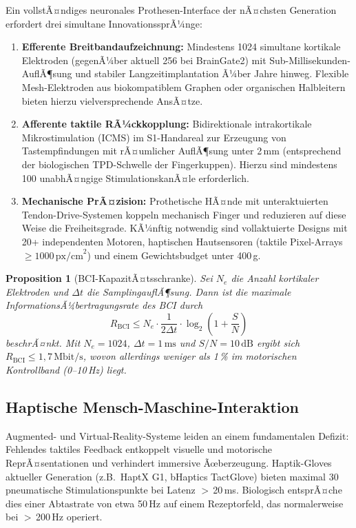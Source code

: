 ﻿\documentclass[12pt,a4paper]{report}
\theoremstyle{plain}
\newtheorem{proposition}[theorem]{Proposition}
\theoremstyle{definition}
\theoremstyle{remark}
\begin{document}
Ein vollstÃ¤ndiges neuronales Prothesen-Interface der nÃ¤chsten Generation
erfordert drei simultane InnovationssprÃ¼nge:

\begin{enumerate}
\item \textbf{Efferente Breitbandaufzeichnung:} Mindestens 1024 simultane
  kortikale Elektroden (gegenÃ¼ber aktuell 256 bei BrainGate2) mit
  Sub-Millisekunden-AuflÃ¶sung und stabiler Langzeitimplantation Ã¼ber
  Jahre hinweg. Flexible Mesh-Elektroden aus biokompatiblem Graphen
  oder organischen Halbleitern bieten hierzu vielversprechende AnsÃ¤tze.
\item \textbf{Afferente taktile RÃ¼ckkopplung:} Bidirektionale
  intrakortikale Mikrostimulation (ICMS) im S1-Handareal zur Erzeugung
  von Tastempfindungen mit rÃ¤umlicher AuflÃ¶sung unter 2\,mm
  (entsprechend der biologischen TPD-Schwelle der Fingerkuppen).
  Hierzu sind mindestens 100 unabhÃ¤ngige StimulationskanÃ¤le erforderlich.
\item \textbf{Mechanische PrÃ¤zision:} Prothetische HÃ¤nde mit
  unteraktuierten Tendon-Drive-Systemen koppeln mechanisch Finger
  und reduzieren auf diese Weise die Freiheitsgrade. KÃ¼nftig notwendig
  sind vollaktuierte Designs mit 20+ independenten Motoren,
  haptischen Hautsensoren (taktile Pixel-Arrays $\geq 1000\,\text{px/cm}^2$)
  und einem Gewichtsbudget unter 400\,g.
\end{enumerate}

\begin{proposition}[BCI-KapazitÃ¤tsschranke]
Sei $N_e$ die Anzahl kortikaler Elektroden und $\Delta t$ die
SamplingauflÃ¶sung. Dann ist die maximale InformationsÃ¼bertragungsrate
des BCI durch
\begin{equation}
  R_{\mathrm{BCI}} \leq N_e \cdot \frac{1}{2\Delta t}
  \cdot \log_2\!\left(1 + \frac{S}{N}\right)
\end{equation}
beschrÃ¤nkt. Mit $N_e = 1024$, $\Delta t = 1\,\mathrm{ms}$ und
$S/N = 10\,\mathrm{dB}$ ergibt sich $R_{\mathrm{BCI}} \leq 1{,}7\,\mathrm{Mbit/s}$,
wovon allerdings weniger als 1\,\% im motorischen Kontrollband
(0--10\,Hz) liegt.
\end{proposition}

\subsection{Haptische Mensch-Maschine-Interaktion}

Augmented- und Virtual-Reality-Systeme leiden an einem fundamentalen
Defizit: Fehlendes taktiles Feedback entkoppelt visuelle und motorische
ReprÃ¤sentationen und verhindert immersive Ãœberzeugung. Haptik-Gloves
aktueller Generation (z.B.\ HaptX G1, bHaptics TactGlove) bieten
maximal 30 pneumatische Stimulationspunkte bei Latenz $>$\,20\,ms.
Biologisch entsprÃ¤che dies einer Abtastrate von etwa 50\,Hz auf einem
Rezeptorfeld, das normalerweise bei $>$\,200\,Hz operiert.
\end{document}
